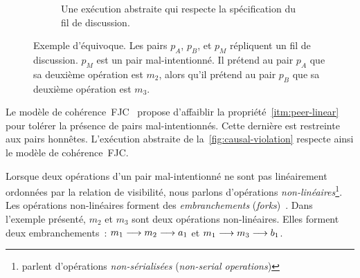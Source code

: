 \begin{figure}[htb]
\begin{subfigure}{\linewidth}
    \caption{Une exécution abstraite qui respecte la spécification du fil de discussion.}
\end{subfigure}
\caption[Exemple de violation du modèle de cohérence causale]{Exemple d'équivoque.
Les pairs $p_A$, $p_B$, et $p_M$ répliquent un fil de discussion.
$p_M$ est un pair mal-intentionné.
Il prétend au pair $p_A$ que sa deuxième opération est $m_2$, alors qu'il prétend au pair $p_B$ que sa deuxième opération est $m_3$.}\label{fig:causal-violation}
\end{figure}

Le modèle de cohérence~\acf{FJC}~\autocite{mahajan_2011_cac,mahajan_astro_2008} propose d'affaiblir la propriété~\ref{itm:peer-linear} pour tolérer la présence de pairs mal-intentionnés.
Cette dernière est restreinte aux pairs honnêtes.
L'exécution abstraite de la~\autoref{fig:causal-violation} respecte ainsi le modèle de cohérence~\ac{FJC}.

Lorsque deux opérations d'un pair mal-intentionné ne sont pas linéairement ordonnées par la relation de visibilité, nous parlons d'opérations \emph{non-linéaires}\footnote{\textcite{mahajan_2011_cac} parlent d'opérations \emph{non-sérialisées} (\emph{non-serial operations})}.
Les opérations non-linéaires forment des \emph{embranchements} (\emph{forks})~\autocite{li_2004_sundr}.
Dans l'exemple présenté, $m_2$ et $m_3$ sont deux opérations non-linéaires. Elles forment deux embranchements~: $m_1 \longrightarrow m_2 \longrightarrow a_1$ et $m_1 \longrightarrow m_3 \longrightarrow b_1$.

